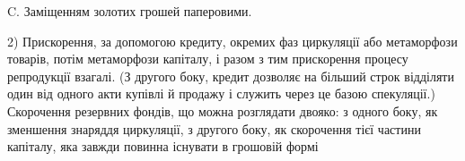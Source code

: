 C. Заміщенням золотих грошей паперовими.

2) Прискорення, за допомогою кредиту, окремих фаз циркуляції
або метаморфози товарів, потім метаморфози капіталу, і разом
з тим прискорення процесу репродукції взагалі. (З другого боку,
кредит дозволяє на більший строк відділяти один від одного акти
купівлі й продажу і служить через це базою спекуляції.) Скорочення резервних фондів, що можна
розглядати двояко: з одного
боку, як зменшення знаряддя циркуляції, з другого боку, як скорочення тієї частини капіталу, яка
завжди повинна існувати в грошовій формі
\parbreak{}  %
